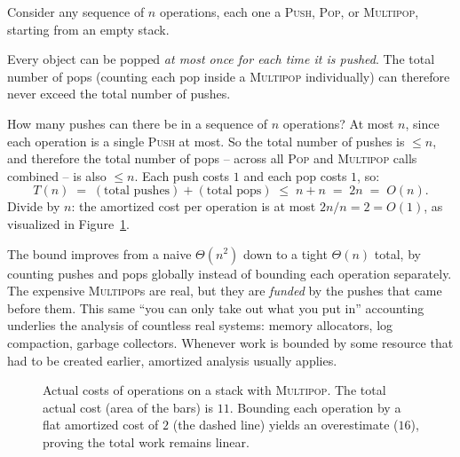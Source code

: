 Consider any sequence of $n$ operations, each one a
\textsc{Push}, \textsc{Pop}, or \textsc{Multipop}, starting from an empty stack.

\begin{focusbox}
Every object can be popped \emph{at most once for each time it is pushed}. The
total number of pops (counting each pop inside a \textsc{Multipop} individually)
can therefore never exceed the total number of pushes.
\end{focusbox}

How many pushes can there be in a sequence of $n$ operations? At most $n$, since
each operation is a single \textsc{Push} at most. So the total number of pushes is
$\le n$, and therefore the total number of pops -- across all \textsc{Pop} and
\textsc{Multipop} calls combined -- is also $\le n$. Each push costs $1$ and each
pop costs $1$, so:
\[
  T(n) \;=\; (\text{total pushes}) + (\text{total pops}) \;\le\; n + n \;=\; 2n
  \;=\; O(n).
\]
Divide by $n$: the amortized cost per operation is at most $2n / n = 2 = O(1)$, as visualized in Figure~\ref{fig:multipop-bars}.

\begin{aestheticbox}
The bound improves from a naive $\Theta(n^2)$ down to a tight
$\Theta(n)$ total, by counting pushes and pops globally instead of bounding
each operation separately. The expensive \textsc{Multipop}s are real, but they are
\emph{funded} by the pushes that came before them. This same ``you can only take
out what you put in'' accounting underlies the analysis of countless real systems:
memory allocators, log compaction, garbage collectors. Whenever work is bounded by
some resource that had to be created earlier, amortized analysis usually applies.
\end{aestheticbox}

\begin{figure}[htbp]
\centering
{}
\vspace{0.5cm}
\caption{Actual costs of operations on a stack with \textsc{Multipop}. The total actual cost (area of the bars) is $11$. Bounding each operation by a flat amortized cost of $2$ (the dashed line) yields an overestimate ($16$), proving the total work remains linear.}
\label{fig:multipop-bars}
\end{figure}

